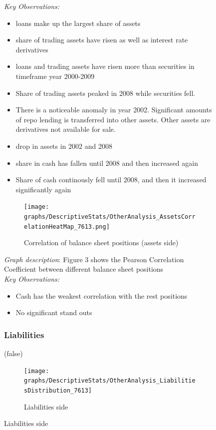 \documentclass[12pt, a4paper]{article} %
\begin{document}
\begin{figure}[hbtp]
\noindent \textit{Key Observations:}
\begin{itemize}
\item loans make up the largest share of assets
\item share of trading assets have risen as well as interest rate derivatives
\item loans and trading assets have risen more than securities in timeframe year 2000-2009
\item Share of trading assets peaked in 2008 while securities fell.
\item There is a noticeable anomaly in year 2002. Significant amounts of repo lending is transferred into other assets. Other assets are derivatives not available for sale. 
\item drop in assets in 2002 and 2008
\item share in cash has fallen until 2008 and then increased again
\item Share of cash continously fell until 2008, and then it increased significantly again
\end{itemize}

\newpage

\begin{figure}[hbtp]
\centering
\caption{Correlation of balance sheet positions (assets side)}
\texttt{[image: graphs/DescriptiveStats/OtherAnalysis\_AssetsCorrelationHeatMap\_7613.png]}
\end{figure}

\noindent \textit{Graph description}: Figure 3 shows the Pearson Correlation Coefficient between different balance sheet positions\\

\textit{Key Observations:}
\begin{itemize}
\item Cash has the weakest correlation with the rest positions
\item No significant stand outs
\end{itemize}

\newpage

\subsubsection{Liabilities}

\if(false)
\begin{figure}[hbtp]
\centering
\caption{Liabilities side}
\texttt{[image: graphs/DescriptiveStats/OtherAnalysis\_LiabilitiesDistribution\_7613]}
\end{figure}





\end{figure}
\end{document}
